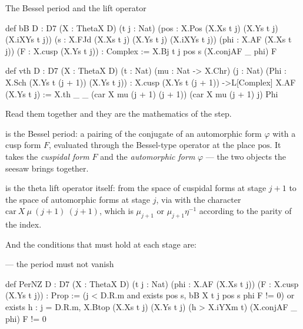 \begin{seamnote}{The Bessel period and the lift operator}
{\footnotesize
\begin{leanquote}
def bB {D : D7} (X : ThetaX D) (t j : Nat)
    (pos : X.Pos (X.Xs t j) (X.Ys t j) (X.iXYs t j))
(s : X.FJd (X.Xs t j) (X.Ys t j) (X.iXYs t j)) (phi : X.AF
      (X.Xs t j))
    (F : X.cusp (X.Ys t j)) : Complex :=
  X.Bj t j pos s (X.conjAF _ phi) F

def vth {D : D7} (X : ThetaX D) (t : Nat) (mu : Nat ->
  X.Chr) (j : Nat)
(Phi : X.Sch (X.Ys t (j + 1)) (X.Ys t j)) : X.cusp (X.Ys t
      (j + 1)) ->L[Complex] X.AF (X.Ys t j) :=
X.th _ _ (car X mu (j + 1) (j + 1)) (car X mu (j + 1) j) Phi
\end{leanquote}
}
\end{seamnote}

Read them together and they are the mathematics of the step.

\begin{description}[style=nextline,leftmargin=0pt,labelwidth=0pt,labelsep=0pt,font=\sffamily\bfseries\small,
  itemsep=6pt]
\item[\code{bB}] is the Bessel period: a pairing of the conjugate of an
automorphic form $\varphi$ with a cusp form $F$, evaluated through the
Bessel-type operator  at the place $\mathrm{pos}$. It takes the
\emph{cuspidal form} $F$ and the \emph{automorphic form} $\varphi$ --- the two
objects the seesaw brings together.
\item[\code{vth}] is the theta lift operator itself: from the space of
cuspidal forms at stage $j+1$ to the space of automorphic forms at stage $j$,
via  with the character $\mathrm{car}\ X\ \mu\ (j+1)\ (j+1)$, which
is $\mu_{j+1}$ or $\mu_{j+1}\eta^{-1}$ according to the parity of the index.
\end{description}

And the conditions that must hold at each stage are:

\begin{seamnote}{ --- the period must not vanish}
{\footnotesize
\begin{leanquote}
def PerNZ {D : D7} (X : ThetaX D) (t j : Nat) (phi : X.AF
  (X.Xs t j)) (F : X.cusp (X.Ys t j)) : Prop :=
  (j < D.R.m and exists pos s, bB X t j pos s phi F != 0) or
exists h : j = D.R.m, X.Btop (X.Xs t j) (X.Ys t j) (h >
      X.iYXm t) (X.conjAF _ phi) F != 0
\end{leanquote}
}
\end{seamnote}

